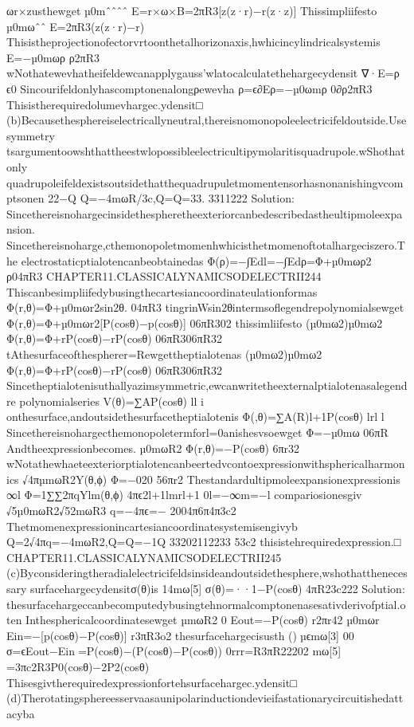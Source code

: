 {{{{{{{{{{{{{{{{ωr×zusthewget
µ0mˆˆˆˆ
E=r×ω×B=2πR3[z(z·r)−r(z·z)]
Thissimpliifesto
µ0mωˆˆ
E=2πR3(z(z·r)−r)
Thisistheprojectionofectorvrtoonthetalhorizonaxis,hwhicincylindricalsystemis
E=−µ0mωρ
ρ2πR3
wNothatewevhatheifeldewcanapplygauss’wlatocalculatethehargecydensit
∇·E=ρ
ϵ0
Sincourifeldonlyhascomptonenalongρewevha
ρ=ϵ∂Eρ=−µ0ωmρ
0∂ρ2πR3
Thisistherequiredolumevhargec.ydensit□
(b)Becausethesphereiselectricallyneutral,thereisnomonopoleelectricifeldoutside.Usesymmetry
tsargumentoowshthattheestwlopossibleelectricultipymolaritisquadrupole.wShothatonly
quadrupoleifeldexistsoutsidethatthequadrupuletmomentensorhasnonanishingvcomptsonen
22−Q
Q=−4mωR/3c,Q=Q=33.
3311222
Solution:
Sincethereisnohargecinsidethespheretheexteriorcanbedescribedastheultipmoleexpansion.
Sincethereisnoharge,cthemonopoletmomenhwhicisthetmomenoftotalhargeciszero.The
electrostaticptialotencanbeobtainedas
Φ(ρ)=−∫Edl=−∫Edρ=Φ+µ0mωρ2
ρ04πR3
CHAPTER11.CLASSICALYNAMICSODELECTRII244
Thiscanbesimpliifedybusingthecartesiancoordinateulationformas
Φ(r,θ)=Φ+µ0mωr2sin2θ.
04πR3
tingrinWsin2θintermsoflegendrepolynomialsewget
Φ(r,θ)=Φ+µ0mωr2[P(cosθ)−p(cosθ)]
06πR302
thissimliifesto
(µ0mω2)µ0mω2
Φ(r,θ)=Φ+rP(cosθ)−rP(cosθ)
06πR306πR32
tAthesurfaceofthespherer=Rewgettheptialotenas
(µ0mω2)µ0mω2
Φ(r,θ)=Φ+rP(cosθ)−rP(cosθ)
06πR306πR32
Sincetheptialotenisuthallyazimsymmetric,ewcanwritetheexternalptialotenasalegendre
polynomialseries
V(θ)=∑AP(cosθ)
ll
i
onthesurface,andoutsidethesurfacetheptialotenis
Φ(,θ)=∑A(R)l+1P(cosθ)
lrl
l
Sincethereisnohargecthemonopoletermforl=0anishesvsoewget
Φ=−µ0mω
06πR
Andtheexpressionbecomes.
µ0mωR2
Φ(r,θ)=−P(cosθ)
6πr32
wNotathewhaeteexteriorptialotencanbeertedvcontoexpressionwithsphericalharmonics
√4πµmωR2Y(θ,ϕ)
Φ=−020
56πr2
Thestandardultipmoleexpansionexpressionis
∞l
Φ=1∑∑2πqYlm(θ,ϕ)
4πϵ2l+1lmrl+1
0l=−∞m=−l
compariosionesgiv
√5µ0mωR2√52mωR3
q=−4πϵ=−
2004π6π4π3c2
Thetmomenexpressionincartesiancoordinatesystemisengivyb
Q=2√4πq=−4mωR2,Q=Q=−1Q
33202112233
53c2
thisistehrequiredexpression.□
CHAPTER11.CLASSICALYNAMICSODELECTRII245
(c)Byconsideringtheradialelectricifeldsinsideandoutsidethesphere,wshothatthenecessary
surfacehargecydensitσ(θ)is
14mω[5]
σ(θ)=··1−P(cosθ)
4πR23c222
Solution:
thesurfacehargeccanbecomputedybusingtehnormalcomptonenasesativderivofptial.oten
Inthesphericalcoordinatesewget
µmωR2
0
Eout=−P(cosθ)
r2πr42
µ0mωr
Ein=−[p(cosθ)−P(cosθ)]
r3πR3o2
thesurfacehargecisusth
()µϵmω[3]
00
σ=ϵEout−Ein=P(cosθ)−(P(cosθ)−P(cosθ))
0rrr=R3πR22202
mω[5]
=3πc2R3P0(cosθ)−2P2(cosθ)
Thisesgivtherequiredexpressionfortehsurfacehargec.ydensit□
(d)Therotatingsphereesservaasaunipolarinductiondevieifastationarycircuitishedattacyba
}}}}}}}}}}}}}}}}
